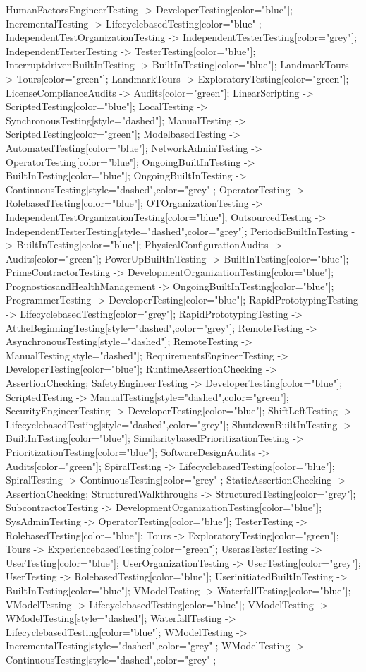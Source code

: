 \documentclass{article}
\begin{document}
{HumanFactorsEngineerTesting -> DeveloperTesting[color="blue"];
IncrementalTesting -> LifecyclebasedTesting[color="blue"];
IndependentTestOrganizationTesting -> IndependentTesterTesting[color="grey"];
IndependentTesterTesting -> TesterTesting[color="blue"];
InterruptdrivenBuiltInTesting -> BuiltInTesting[color="blue"];
LandmarkTours -> Tours[color="green"];
LandmarkTours -> ExploratoryTesting[color="green"];
LicenseComplianceAudits -> Audits[color="green"];
LinearScripting -> ScriptedTesting[color="blue"];
LocalTesting -> SynchronousTesting[style="dashed"];
ManualTesting -> ScriptedTesting[color="green"];
ModelbasedTesting -> AutomatedTesting[color="blue"];
NetworkAdminTesting -> OperatorTesting[color="blue"];
OngoingBuiltInTesting -> BuiltInTesting[color="blue"];
OngoingBuiltInTesting -> ContinuousTesting[style="dashed",color="grey"];
OperatorTesting -> RolebasedTesting[color="blue"];
OTOrganizationTesting -> IndependentTestOrganizationTesting[color="blue"];
OutsourcedTesting -> IndependentTesterTesting[style="dashed",color="grey"];
PeriodicBuiltInTesting -> BuiltInTesting[color="blue"];
PhysicalConfigurationAudits -> Audits[color="green"];
PowerUpBuiltInTesting -> BuiltInTesting[color="blue"];
PrimeContractorTesting -> DevelopmentOrganizationTesting[color="blue"];
PrognosticsandHealthManagement -> OngoingBuiltInTesting[color="blue"];
ProgrammerTesting -> DeveloperTesting[color="blue"];
RapidPrototypingTesting -> LifecyclebasedTesting[color="grey"];
RapidPrototypingTesting -> AttheBeginningTesting[style="dashed",color="grey"];
RemoteTesting -> AsynchronousTesting[style="dashed"];
RemoteTesting -> ManualTesting[style="dashed"];
RequirementsEngineerTesting -> DeveloperTesting[color="blue"];
RuntimeAssertionChecking -> AssertionChecking;
SafetyEngineerTesting -> DeveloperTesting[color="blue"];
ScriptedTesting -> ManualTesting[style="dashed",color="green"];
SecurityEngineerTesting -> DeveloperTesting[color="blue"];
ShiftLeftTesting -> LifecyclebasedTesting[style="dashed",color="grey"];
ShutdownBuiltInTesting -> BuiltInTesting[color="blue"];
SimilaritybasedPrioritizationTesting -> PrioritizationTesting[color="blue"];
SoftwareDesignAudits -> Audits[color="green"];
SpiralTesting -> LifecyclebasedTesting[color="blue"];
SpiralTesting -> ContinuousTesting[color="grey"];
StaticAssertionChecking -> AssertionChecking;
StructuredWalkthroughs -> StructuredTesting[color="grey"];
SubcontractorTesting -> DevelopmentOrganizationTesting[color="blue"];
SysAdminTesting -> OperatorTesting[color="blue"];
TesterTesting -> RolebasedTesting[color="blue"];
Tours -> ExploratoryTesting[color="green"];
Tours -> ExperiencebasedTesting[color="green"];
UserasTesterTesting -> UserTesting[color="blue"];
UserOrganizationTesting -> UserTesting[color="grey"];
UserTesting -> RolebasedTesting[color="blue"];
UserinitiatedBuiltInTesting -> BuiltInTesting[color="blue"];
VModelTesting -> WaterfallTesting[color="blue"];
VModelTesting -> LifecyclebasedTesting[color="blue"];
VModelTesting -> WModelTesting[style="dashed"];
WaterfallTesting -> LifecyclebasedTesting[color="blue"];
WModelTesting -> IncrementalTesting[style="dashed",color="grey"];
WModelTesting -> ContinuousTesting[style="dashed",color="grey"];

}
\end{document}
